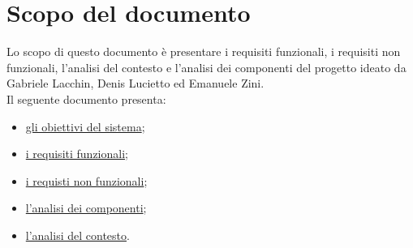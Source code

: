 \section*{Scopo del documento}
Lo scopo di questo documento è presentare i requisiti funzionali, i requisiti non funzionali, l'analisi del contesto e l'analisi dei componenti del progetto \nome ideato da Gabriele Lacchin, Denis Lucietto ed Emanuele Zini.\\
Il seguente documento presenta:
\begin{itemize}
    \item \hyperref[sec:ObiettiviProgetto]{gli obiettivi del sistema};
    \item \hyperref[sec:RequisitiFunzionali]{i requisiti funzionali};
    \item \hyperref[sec:RequisitiNonFunzionali]{i requisti non funzionali};
    \item \hyperref[sec:AnalisiDeiComponenti]{l'analisi dei componenti};
    \item \hyperref[sec:AnalisiDelContesto]{l'analisi del contesto}.
\end{itemize}